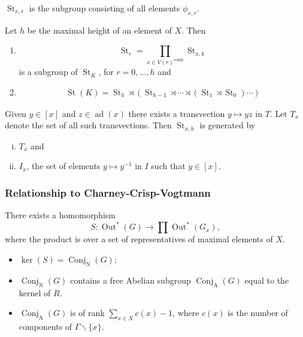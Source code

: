 \documentclass{beamer}
\def\G{\Gamma }
\newcommand{\ad}{{\operatorname{ad}}}
\newcommand{\Out}{\operatorname{Out}}
\newcommand{\maps}{\rightarrow}
\newcommand{\bs}{\backslash}
\newcommand{\St}{\operatorname{St}}
\newcommand{\Conj}{\operatorname{Conj}}
\newcommand{\AConj}{\Conj_{\operatorname{A}}}
\newcommand{\NConj}{\Conj_{\operatorname{N}}}
\newcommand{\cmp}{{\operatorname{{comp}}}}
\newcommand{\be}{\begin{enumerate}}
\newcommand{\ee}{\end{enumerate}}
\newcommand{\bei}{\begin{itemize}}
\newcommand{\eei}{\end{itemize}}
\begin{document}
\begin{frame}
\frametitle{}
$\St_{x,r}$ is the subgroup consisting of all elements $\phi_{x,r}$.
\pause
\begin{theorem}\label{thm:stkdecomp}
 Let $h$ be the maximal height of an element of $X$. Then 
\be
\item \[\St_{r}=\prod_{x\in V(r)^{\cmp}} \St_{x,k}\] is a subgroup of $\St_K$, 
for $r=0,\ldots ,h$ \pause and 
\item 
\begin{gather*}
\St(K)=\St_{h}\rtimes (\St_{h-1} \rtimes 
\cdots \rtimes (\St_{1}\rtimes \St_{0})\cdots )
\end{gather*}
\ee
\end{theorem}
\pause
\begin{theorem}\label{prop:stx1gen}
Given $y\in [x]$ and $z\in \ad(x)$ there exists 
a transvection $y\mapsto yz$ in $T$. Let $T_x$ denote the set
of all such transvections. Then 
$\St_{x,h}$ is generated by 
\be[(i)]
\item
$T_x$ and 
\item $I_x$,  the set of elements $y\mapsto y^{-1}$ in $I$ such that $y\in [x]$.
\ee
\end{theorem}
\end{frame}
\begin{frame}
\frametitle{Relationship to Charney-Crisp-Vogtmann}
There exists a homomorphism 
\[S:\Out^*(G)\maps \prod\Out^*(G_x),\]
where the product is over a set of representatives of maximal elements
of $X$. \\[1em]
\pause

\bei
\item $\ker(S)=\NConj(G)$;
\item $\NConj(G)$ contains  a free Abelian subgroup $\AConj(G)$ equal to the kernel of $R$.
\item $\AConj(G)$ is of rank $\sum_{x\in X} c(x)-1$, where $c(x)$ is the number of components
of $\G\bs\{x\}$. 
\eei
\end{frame}
\end{document}
